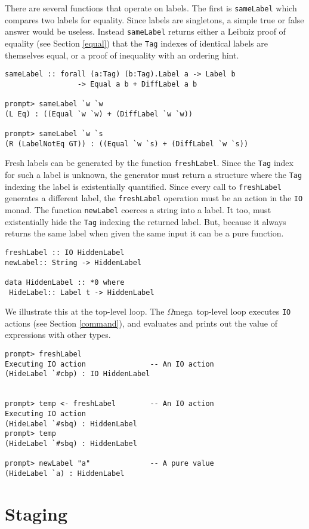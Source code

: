 \documentclass[11pt,twoside]{article}
\newcommand{\om}{$\Omega$mega}
\begin{document}
There are several functions that operate on labels. The first is
{\tt sameLabel} which compares two labels for equality. Since labels
are singletons, a simple true or false answer would be useless.
Instead {\tt sameLabel} returns either a Leibniz proof of equality 
(see Section \ref{equal}) that the {\tt Tag}
indexes of identical labels are themselves equal, or a proof of
inequality with an ordering hint.
\begin{verbatim}
sameLabel :: forall (a:Tag) (b:Tag).Label a -> Label b
                 -> Equal a b + DiffLabel a b

prompt> sameLabel `w `w
(L Eq) : ((Equal `w `w) + (DiffLabel `w `w))

prompt> sameLabel `w `s
(R (LabelNotEq GT)) : ((Equal `w `s) + (DiffLabel `w `s))
\end{verbatim}

Fresh labels can be generated by the function {\tt freshLabel}.
Since the {\tt Tag} index for such a label is unknown, the generator
must return a structure where the
{\tt Tag} indexing the label is existentially quantified. Since every call
to {\tt freshLabel} generates a different label, the {\tt freshLabel}
operation must be an action in the {\tt IO} monad. The function
{\tt newLabel} coerces a string into a label. It too, must
existentially hide the {\tt Tag} indexing the returned label. But,
because it always returns the same label when given the same input
it can be a pure function.

\begin{verbatim}
freshLabel :: IO HiddenLabel
newLabel:: String -> HiddenLabel

data HiddenLabel :: *0 where 
 HideLabel:: Label t -> HiddenLabel
\end{verbatim}
We illustrate this at the top-level loop. The \om\ top-level loop executes
{\tt IO} actions (see Section \ref{command}), and evaluates and prints
out the value of expressions with other types.
\begin{verbatim}
prompt> freshLabel
Executing IO action               -- An IO action
(HideLabel `#cbp) : IO HiddenLabel


prompt> temp <- freshLabel        -- An IO action
Executing IO action
(HideLabel `#sbq) : HiddenLabel
prompt> temp
(HideLabel `#sbq) : HiddenLabel

prompt> newLabel "a"              -- A pure value
(HideLabel `a) : HiddenLabel
\end{verbatim}

\section{Staging}
\end{document}

